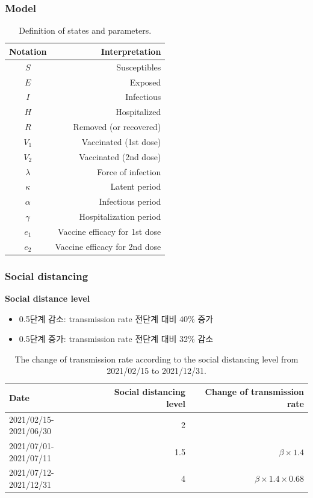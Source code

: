 \documentclass[aspectratio=169, 9pt, xcolor=dvipsnames]{beamer}
\begin{document}
	\begin{frame}\frametitle{Model}
	    \begin{table}
	    	\begin{tabular}{cr}
	    		\toprule
	    		\textbf{Notation} & \textbf{Interpretation} \\
	    		\midrule
	    		$S$ & Susceptibles \\
	    		$E$ & Exposed \\
	    		$I$ & Infectious \\
	    		$H$ & Hospitalized \\
	    		$R$ & Removed (or recovered) \\
	    		$V_1$ & Vaccinated (1st dose) \\
	    		$V_2$ & Vaccinated (2nd dose) \\
	    		$\lambda$ & Force of infection \\
	    		$\kappa$ & Latent period \\
	    		$\alpha$ & Infectious period \\
	    		$\gamma$ & Hospitalization period \\
	    		$e_1$ & Vaccine efficacy for 1st dose \\
	    		$e_2$ & Vaccine efficacy for 2nd dose \\
	    		\bottomrule
	    	\end{tabular}
	    	\caption{Definition of states and parameters.}
	    \end{table}
	\end{frame}

	\begin{frame}\frametitle{Social distancing}
		\textbf{Social distance level}
		\begin{itemize}
			\item 0.5단계 감소: transmission rate 전단계 대비 40\% 증가
			\item 0.5단계 증가: transmission rate 전단계 대비 32\% 감소
		\end{itemize}
	    \begin{table}
	    	\begin{tabular}{lrr}
	    		\toprule
	    		\textbf{Date} & \textbf{Social distancing level} & \textbf{Change of transmission rate} \\
	    		\midrule
	    		2021/02/15-2021/06/30 & 2 &  \\
	    		2021/07/01-2021/07/11 & 1.5 & $\beta \times 1.4$ \\
	    		2021/07/12-2021/12/31\footnotemark[2] & 4 & $\beta \times 1.4 \times 0.68$ \\
	    		\bottomrule
	    	\end{tabular}
	    	\caption{The change of transmission rate according to the social distancing level from 2021/02/15 to 2021/12/31.}
	    \end{table}
	\end{frame}
\end{document}
